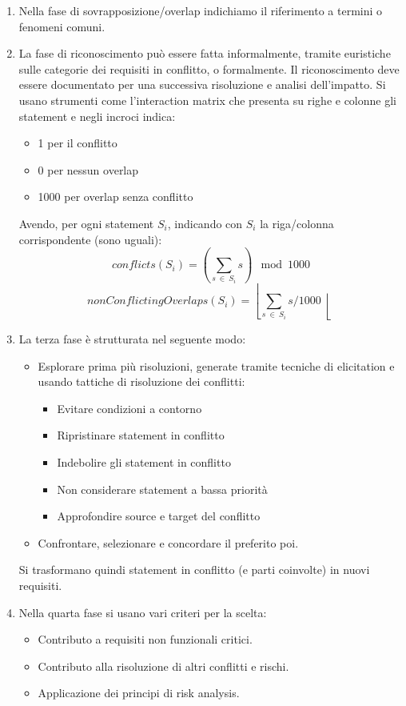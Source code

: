 \begin{enumerate}
    \item Nella fase di sovrapposizione/overlap indichiamo il riferimento a termini o fenomeni comuni.
    \item La fase di riconoscimento può essere fatta informalmente, tramite euristiche sulle categorie dei requisiti in conflitto, o formalmente. Il riconoscimento deve essere documentato per una successiva risoluzione e analisi dell'impatto. Si usano strumenti come l'interaction matrix che presenta su righe e colonne gli statement e negli incroci indica:
    \begin{itemize}
        \item 1 per il conflitto
        \item 0 per nessun overlap
        \item 1000 per overlap senza conflitto
    \end{itemize}
    Avendo, per ogni statement $S_i$, indicando con $S_i$ la riga/colonna corrispondente (sono uguali):
    \begin{equation}
        conflicts(S_i) = \left(\sum_{s \ \in \ S_i} s \right) \mod 1000
    \end{equation}
    \begin{equation}
        nonConflictingOverlaps(S_i) = \left\lfloor \sum_{s \ \in \ S_i} s / 1000 \right\lfloor
    \end{equation}
    \item La terza fase è strutturata nel seguente modo:
    \begin{itemize}
        \item Esplorare prima più risoluzioni, generate tramite tecniche di elicitation e usando tattiche di risoluzione dei conflitti:
        \begin{itemize}
            \item Evitare condizioni a contorno
            \item Ripristinare statement in conflitto
            \item Indebolire gli statement in conflitto
            \item Non considerare statement a bassa priorità
            \item Approfondire source e target del conflitto
        \end{itemize}
        \item Confrontare, selezionare e concordare il preferito poi.
    \end{itemize}
    Si trasformano quindi statement in conflitto (e parti coinvolte) in nuovi requisiti.
    \item Nella quarta fase si usano vari criteri per la scelta:
    \begin{itemize}
        \item Contributo a requisiti non funzionali critici.
        \item Contributo alla risoluzione di altri conflitti e rischi.
        \item Applicazione dei principi di risk analysis.
    \end{itemize}
\end{enumerate}

